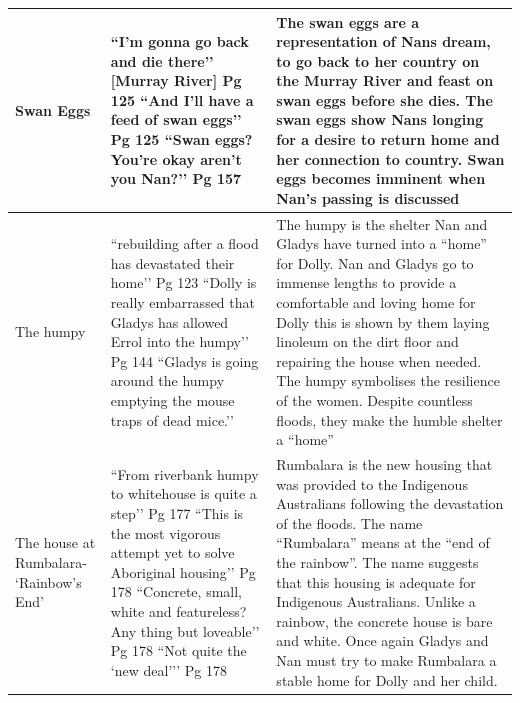 \documentclass[a4paper]{article}
\begin{document}
\begin{longtable}{|p{2cm}|p{4cm}|p{7cm}|}
Swan Eggs &
``I’m gonna go back and die there’’ [Murray River] Pg 125 \newline
``And I’ll have a feed of swan eggs’’ Pg 125 \newline
``Swan eggs? You’re okay aren’t you Nan?’’ Pg 157 &
The swan eggs are a representation of Nans dream, to go back to her country on the Murray River and feast on swan eggs before she dies. The swan eggs show Nans longing for a desire to return home and her connection to country. Swan eggs becomes imminent when Nan’s passing is discussed \\
\hline

The humpy &
``rebuilding after a flood has devastated their home’’ Pg 123 \newline
``Dolly is really embarrassed that Gladys has allowed Errol into the humpy’’ Pg 144 \newline
``Gladys is going around the humpy emptying the mouse traps of dead mice.’’ &
The humpy is the shelter Nan and Gladys have turned into a “home” for Dolly. Nan and Gladys go to immense lengths to provide a comfortable and loving home for Dolly this is shown by them laying linoleum on the dirt floor and repairing the house when needed. The humpy symbolises the resilience of the women. Despite countless floods, they make the humble shelter a “home” \\
\hline

The house at Rumbalara- ‘Rainbow’s End’ &
``From riverbank humpy to whitehouse is quite a step’’ Pg 177 \newline
``This is the most vigorous attempt yet to solve Aboriginal housing’’ Pg 178 \newline
``Concrete, small, white and featureless? Any thing but loveable’’ Pg 178 \newline
``Not quite the ‘new deal’’’ Pg 178 &
Rumbalara is the new housing that was provided to the Indigenous Australians following the devastation of the floods. The name “Rumbalara” means at the “end of the rainbow”. The name suggests that this housing is adequate for Indigenous Australians. Unlike a rainbow, the concrete house is bare and white. Once again Gladys and Nan must try to make Rumbalara a stable home for Dolly and her child. \\
\hline


\end{longtable}
\end{document}
